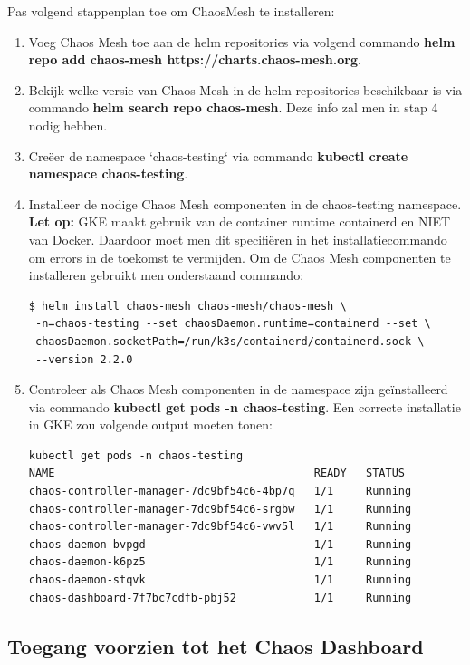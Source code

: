 Pas volgend stappenplan toe om ChaosMesh te installeren:
\begin{enumerate}
    \item Voeg Chaos Mesh toe aan de helm repositories via volgend commando {\bf helm repo add chaos-mesh https://charts.chaos-mesh.org}.
    \item Bekijk welke versie van Chaos Mesh in de helm repositories beschikbaar is via commando {\bf helm search repo chaos-mesh}. Deze info zal men in stap 4 nodig hebben.
    \item Creëer de namespace `chaos-testing` via commando {\bf kubectl create namespace chaos-testing}.
    \item Installeer de nodige Chaos Mesh componenten in de chaos-testing namespace. {\bf Let op:} GKE maakt gebruik van de container runtime containerd en NIET van Docker. Daardoor moet men dit specifiëren in het installatiecommando om errors in de toekomst te vermijden. Om de Chaos Mesh componenten te installeren gebruikt men onderstaand commando:
\begin{lstlisting}
$ helm install chaos-mesh chaos-mesh/chaos-mesh \
 -n=chaos-testing --set chaosDaemon.runtime=containerd --set \
 chaosDaemon.socketPath=/run/k3s/containerd/containerd.sock \
 --version 2.2.0    
\end{lstlisting}
    \item Controleer als Chaos Mesh componenten in de namespace zijn geïnstalleerd via commando {\bf kubectl get pods -n chaos-testing}. Een correcte installatie in GKE zou volgende output moeten tonen: 
\begin{lstlisting}  
kubectl get pods -n chaos-testing
NAME                                        READY   STATUS   
chaos-controller-manager-7dc9bf54c6-4bp7q   1/1     Running
chaos-controller-manager-7dc9bf54c6-srgbw   1/1     Running
chaos-controller-manager-7dc9bf54c6-vwv5l   1/1     Running
chaos-daemon-bvpgd                          1/1     Running
chaos-daemon-k6pz5                          1/1     Running
chaos-daemon-stqvk                          1/1     Running
chaos-dashboard-7f7bc7cdfb-pbj52            1/1     Running   
\end{lstlisting}  
\end{enumerate}

\subsection{Toegang voorzien tot het Chaos Dashboard}
\label{subsec: toegangdashboard}

